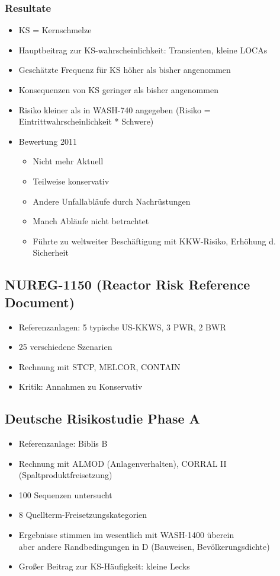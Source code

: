 \documentclass[12pt]{article}
\begin{document}
\subsubsection{Resultate}
\begin{itemize}
  \item KS = Kernschmelze
  \item Hauptbeitrag zur KS-wahrscheinlichkeit: Transienten, kleine LOCAs
  \item Geschätzte Frequenz für KS höher als bisher angenommen
  \item Konsequenzen von KS geringer als bisher angenommen
  \item Risiko kleiner als in WASH-740 angegeben (Risiko = Eintrittwahrscheinlichkeit * Schwere)
  \item Bewertung 2011
  \begin{itemize}
    \item Nicht mehr Aktuell
    \item Teilweise konservativ
    \item Andere Unfallabläufe durch Nachrüstungen
    \item Manch Abläufe nicht betrachtet
    \item Führte zu weltweiter Beschäftigung mit KKW-Risiko, Erhöhung d. Sicherheit
  \end{itemize}
\end{itemize}

\subsection{NUREG-1150 (Reactor Risk Reference Document)}
\begin{itemize}
  \item Referenzanlagen: 5 typische US-KKWS, 3 PWR, 2 BWR
  \item 25 verschiedene Szenarien
  \item Rechnung mit STCP, MELCOR, CONTAIN
  \item Kritik: Annahmen zu Konservativ
\end{itemize}

\subsection{Deutsche Risikostudie Phase A}
\begin{itemize}
  \item Referenzanlage: Biblis B
  \item Rechnung mit ALMOD (Anlagenverhalten), CORRAL II (Spaltproduktfreisetzung)
  \item 100 Sequenzen untersucht
  \item 8 Quellterm-Freisetzungskategorien
  \item Ergebnisse stimmen im wesentlich mit WASH-1400 überein\\
  aber andere Randbedingungen in D (Bauweisen, Bevölkerungsdichte)
  \item Großer Beitrag zur KS-Häufigkeit: kleine Lecks
\end{itemize}
\end{document}
